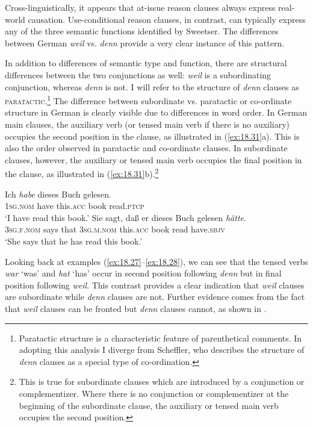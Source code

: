Cross-linguistically, it appears that at-issue reason clauses always express real-world causation. Use-conditional reason clauses, in contrast, can typically express any of the three semantic functions identified by Sweetser. The differences between German \textit{weil} vs. \textit{denn} provide a very clear instance of this pattern.


In addition to differences of semantic type and function, there are structural differences between the two conjunctions as well: \textit{weil} is a subordinating conjunction, whereas \textit{denn} is not. I will refer to the structure of \textit{denn} clauses as \textsc{paratactic}.\footnote{Paratactic structure is a characteristic feature of parenthetical comments. In adopting this analysis I diverge from Scheffler, who describes the structure of \textit{denn} clauses as a special type of co-ordination.} The difference between subordinate vs. paratactic or co-ordinate structure in German is clearly visible due to differences in word order. In German main clauses, the auxiliary verb (or tensed main verb if there is no auxiliary) occupies the second position in the clause, as illustrated in (\ref{ex:18.31}a). This is also the order observed in paratactic and co-ordinate clauses. In subordinate clauses, however, the auxiliary or tensed main verb occupies the final position in the clause, as illustrated in (\ref{ex:18.31}b).\footnote{This is true for subordinate clauses which are introduced by a conjunction or complementizer. Where there is no conjunction or complementizer at the beginning of the subordinate clause, the auxiliary or tensed main verb occupies the second position.}


\ea \label{ex:18.31}
\ea   \gll Ich  \textit{habe}  dieses  Buch  gelesen.\\
\textsc{1sg}.\textsc{nom}  have  this.\textsc{acc}  book  read.\textsc{ptcp}\\
\glt ‘I have read this book.’
\ex \gll Sie  sagt,  daß  er  dieses  Buch  gelesen  \textit{hätte}.\\
\textsc{3sg}.\textsc{f}.\textsc{nom}  says  that  \textsc{3sg}.\textsc{m}.\textsc{nom}  this.\textsc{acc}  book  read  have.\textsc{sbjv}\\
\glt ‘She says that he has read this book.’
\z \z


Looking back at examples (\ref{ex:18.27}--\ref{ex:18.28}), we can see that the tensed verbs \textit{war} ‘was’ and \textit{hat} ‘has’ occur in second position following \textit{denn} but in final position following \textit{weil}. This contrast provides a clear indication that \textit{weil} clauses are subordinate while \textit{denn} clauses are not. Further evidence comes from the fact that \textit{weil} clauses can be fronted but \textit{denn} clauses cannot, as shown in . 

